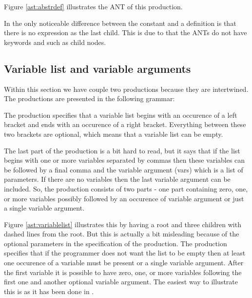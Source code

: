 Figure \ref{ast:abstrdef} illustrates the ANT of this production.



In  the only noticeable difference between the constant and 
a definition is that there is no expression as the last child.  This is due to
that the ANTs do not have keywords and such as child nodes.


\subsection{Variable list and variable arguments}
Within this section we have couple two productions because they are intertwined. 
The productions are presented in the following grammar:

\begin{ebnf}
\end{ebnf}

The production specifies that a variable list begins with an occurence of a left
bracket and ends with an occurence of a right bracket. Everything between these
two brackets are optional, which means that a variable list can be empty.

The last part of the production is a bit hard to read, but it says that if the
list begins with one or more variables separated by commas then these variables
can be followed by a final comma and the variable argument (vars) which is a
list of parameters. If there are no variables then the last variable argument
can be included. So, the production consists of two parts - one part containing
zero, one, or more variables possibly followed by an occurence of variable
argument or just a single variable argument.



Figure \ref{ast:variablelist} illustrates this by having a root and three
children with dashed lines from the root. But this is actually a bit misleading
because of the optional parameters in the specification of the production. The
production specifies that if the programmer does not want the list to be empty
then at least one occurence of a variable must be present or a single variable
argument. After the first variable it is possible to have zero, one, or more
variables following the first one and another optional variable argument. The
easiest way to illustrate this is as it has been done in
.

